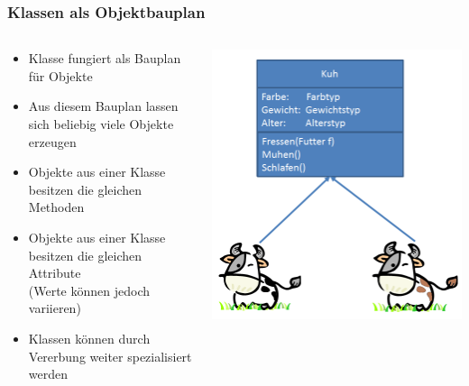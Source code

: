 \begin{frame}
\frametitle{Klassen als Objektbauplan}
	\begin{columns}
	    \begin{column}{.6\textwidth}
			\small
			\begin{itemize}
			  \item Klasse fungiert als Bauplan f\"ur Objekte
			  \item Aus diesem Bauplan lassen sich beliebig viele Objekte erzeugen
			  \item Objekte aus einer Klasse besitzen die gleichen Methoden
			  \item Objekte aus einer Klasse besitzen die gleichen Attribute \\(Werte
			  k\"onnen jedoch variieren)
			  \item Klassen k\"onnen durch Vererbung weiter spezialisiert werden
			\end{itemize}
			\normalsize
	    \end{column}
	    \begin{column}{.4\textwidth}
	   		\center
			\includegraphics[width=\textwidth,
			keepaspectratio=true]{bilder/kuh_klasse.png}
	    \end{column}
	\end{columns} 
\end{frame}

